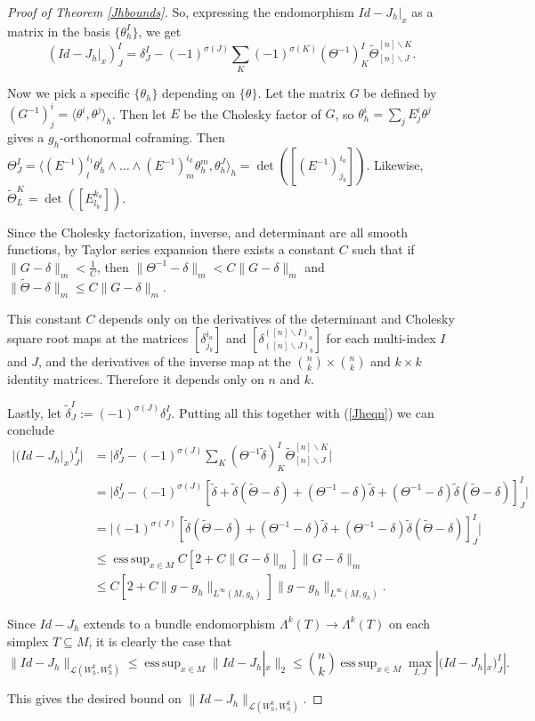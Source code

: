 \documentclass[11pt]{article}
\newcommand{\iprod}[1]{\langle #1 \rangle}
\DeclareMathOperator*{\esssup}{ess\,sup}
\begin{document}
\begin{proof}[Proof of Theorem \ref{Jhbounds}]
So, expressing the endomorphism $Id - J_h|_x$ as a matrix in the basis $\{\theta^I_h\}$, we get
\begin{equation}\label{Jheqn}(Id - J_h|_x)^I_J = \delta^I_J - (-1)^{\sigma(J)}\sum_K(-1)^{\sigma(K)}(\Theta^{-1})^I_K\tilde\Theta^{[n]\backslash K}_{[n]\backslash J}.\end{equation}

Now we pick a specific $\{\theta_h\}$ depending on $\{\theta\}$. Let the matrix $G$ be defined by $(G^{-1})^i_j = \iprod{\theta^i,\theta^j}_h$. Then let $E$ be the Cholesky factor of $G$, so $\theta^i_h = \sum_j E^i_j\theta^j$ gives a $g_h$-orthonormal coframing. Then $\Theta^I_J = \iprod{(E^{-1})^{i_1}_l\theta_h^l\wedge\dots\wedge (E^{-1})^{i_k}_m\theta_h^m,\theta^J_h}_h = \det([(E^{-1})^{i_a}_{j_b}])$. Likewise, $\tilde\Theta^K_L = \det([E^{k_a}_{l_b}])$.



Since the Cholesky factorization, inverse, and determinant are all smooth functions, by Taylor series expansion there exists a constant $C$ such that if $\|G - \delta\|_m < \frac{1}{C}$, then $\|\Theta^{-1} - \delta\|_m < C\|G - \delta\|_m$ and $\|\tilde\Theta - \delta\|_m \le C\|G - \delta\|_m$.
 
This constant $C$ depends only on the derivatives of the determinant and Cholesky square root maps at the matrices $[\delta^{i_a}_{j_b}]$ and $[\delta^{([n]\backslash I)_a}_{([n]\backslash J)_b}]$ for each multi-index $I$ and $J$, and the derivatives of the inverse map at the ${n \choose k}\times{n \choose k}$ and $k\times k$ identity matrices. Therefore it depends only on $n$ and $k$.
 
 Lastly, let $\tilde{\delta}^I_J := (-1)^{\sigma(J)}\delta^I_J$. Putting all this together with (\ref{Jheqn}) we can conclude 
\begin{align*}|(Id - J_h|_x)^I_J| &= \Big|\delta^I_J - (-1)^{\sigma(J)}\sum_K(\Theta^{-1}\tilde{\delta})^I_K\tilde\Theta^{[n]\backslash K}_{[n]\backslash J}\Big|\\
&= \big|\delta^I_J - (-1)^{\sigma(J)}[\tilde{\delta} + \tilde{\delta}(\tilde\Theta - \delta) + (\Theta^{-1} - \delta)\tilde{\delta} + (\Theta^{-1} - \delta)\tilde{\delta}(\tilde\Theta  - \delta)]^I_J\big|\\
&= \big|(-1)^{\sigma(J)}[\tilde{\delta}(\tilde\Theta - \delta) + (\Theta^{-1}-\delta)\tilde{\delta} + (\Theta^{-1} - \delta)\tilde{\delta}(\tilde\Theta - \delta)]^I_J\big|\\
&\le \esssup_{x \in M}C\left[2 + C\|G - \delta\|_m\right]\|G - \delta\|_m\\
&\le C\left[2 + C\|g - g_h\|_{L^\infty(M,g_h)}\right]\|g - g_h\|_{L^\infty(M,g_h)}.\end{align*}

Since $Id - J_h$ extends to a bundle endomorphism $\Lambda^k(T) \to \Lambda^k(T)$ on each simplex $T \subseteq M$, it is clearly the case that
\[\|Id - J_h\|_{\mathcal{L}(W_h^k,W_h^k)} \le \esssup_{x \in M} \|Id - J_h|_x\|_2 \le {n \choose k}\esssup_{x \in M} \max_{I,J}|(Id - J_h|_x)^I_J|.\]

This gives the desired bound on $\|Id - J_h\|_{\mathcal{L}(W_h^k,W_h^k)}$.
\end{proof}
\end{document}
